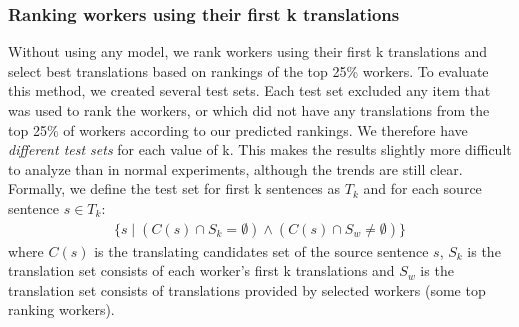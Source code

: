 \documentclass[11pt,letterpaper]{article}
\begin{document}
\subsubsection{Ranking workers using their first k translations}
 Without using any model, we rank workers using their first k translations and select best translations based on rankings of the top 25\% workers. To evaluate this method, we created several test sets.  Each test set excluded any item that was used to rank the workers, or which did not have any translations from the top 25\% of workers according to our predicted rankings.  We therefore have \emph{different test sets} for each value of k.  This makes the results slightly more difficult to analyze than in normal experiments, although the trends are still clear.
Formally, we define the test set for first k sentences as $T_k$ and for each source sentence $s \in T_k$:
\begin{align*}
  \{ s \mid (C(s) \cap S_k = \emptyset)   \wedge (C(s) \cap S_w \neq \emptyset)    \}
\end{align*}
where $C(s)$ is the translating candidates set of the source sentence $s$, $S_k$ is the translation set consists of each worker's first k translations and $S_w$ is the translation set consists of translations provided by selected workers (some top ranking workers). 
\end{document}
